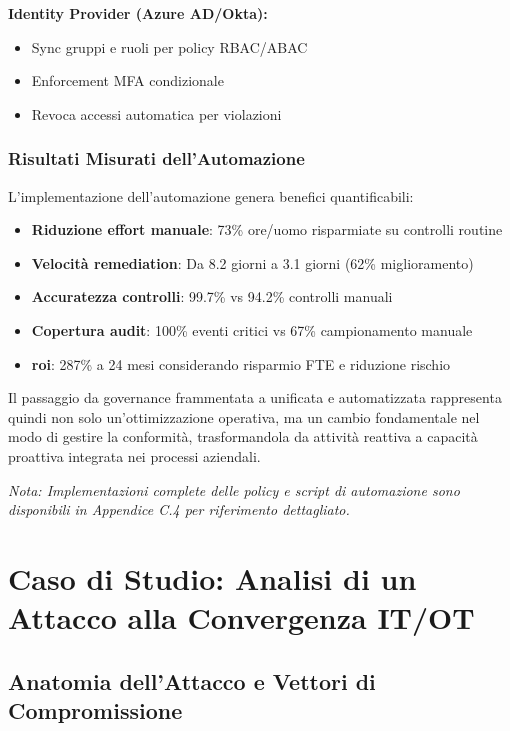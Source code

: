 \textbf{Identity Provider (Azure AD/Okta):}
\begin{itemize}
    \item Sync gruppi e ruoli per policy RBAC/ABAC
    \item Enforcement MFA condizionale
    \item Revoca accessi automatica per violazioni
\end{itemize}

\subsubsection{\texorpdfstring{Risultati Misurati dell'Automazione}{4.4.2.4 - Risultati Misurati dell'Automazione}}

L'implementazione dell'automazione genera benefici quantificabili:

\begin{itemize}
    \item \textbf{Riduzione effort manuale}: 73\% ore/uomo risparmiate su controlli routine
    \item \textbf{Velocità remediation}: Da 8.2 giorni a 3.1 giorni (62\% miglioramento)
    \item \textbf{Accuratezza controlli}: 99.7\% vs 94.2\% controlli manuali
    \item \textbf{Copertura audit}: 100\% eventi critici vs 67\% campionamento manuale
    \item \textbf{\gls{roi}}: 287\% a 24 mesi considerando risparmio FTE e riduzione rischio
\end{itemize}

Il passaggio da \gls{governance} frammentata a unificata e automatizzata rappresenta quindi non solo un'ottimizzazione operativa, ma un cambio fondamentale nel modo di gestire la conformità, trasformandola da attività reattiva a capacità proattiva integrata nei processi aziendali.

\textit{Nota: Implementazioni complete delle policy e script di automazione sono disponibili in Appendice C.4 per riferimento dettagliato.}

\section{\texorpdfstring{Caso di Studio: Analisi di un Attacco alla Convergenza IT/OT}{4.5 - Caso di Studio: Analisi di un Attacco alla Convergenza IT/OT}}

\subsection{\texorpdfstring{Anatomia dell'Attacco e Vettori di Compromissione}{4.5.1 - Anatomia dell'Attacco e Vettori di Compromissione}}

